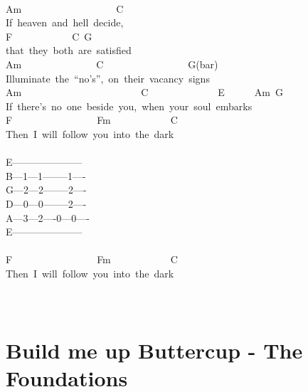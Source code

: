 \documentclass[]{book}
\let\stdsection\section
\renewcommand\section{\clearpage\stdsection}
\begin{document}
~\\
Am~~~~~~~~~~~~~~~~~~~C~~~~~\\
If~heaven~and~hell~decide,~\\
\hspace*{0.333em}\hspace*{0.333em}\hspace*{0.333em}\hspace*{0.333em}\hspace*{0.333em}\hspace*{0.333em}\hspace*{0.333em}\hspace*{0.333em}\hspace*{0.333em}\hspace*{0.333em}\hspace*{0.333em}F~~~~~~~~~~~~C~G\\
that~they~both~are~satisfied\\
Am~~~~~~~~~~~~~~~C~~~~~~~~~~~~~~~~~G(bar)\\
Illuminate~the~``no's'',~on~their~vacancy~signs\\
Am~~~~~~~~~~~~~~~~~~~~~~~~C~~~~~~~~~~~~~~E~~~~~~Am~G\\
If~there's~no~one~beside~you,~when~your~soul~embarks\\
F~~~~~~~~~~~~~~~~~Fm~~~~~~~~~~~~C~~~~\\
Then~I~will~follow~you~into~the~dark\\
~\\
E---------------------\textbar{}\\
B---1---1--------1----\textbar{}\\
G---2---2--------2----\textbar{}\\
D---0---0--------2----\textbar{}\\
A---3---2----0---0----\textbar{}\\
E---------------------\textbar{}\\
~\\
F~~~~~~~~~~~~~~~~~Fm~~~~~~~~~~~~C~~~~\\
Then~I~will~follow~you~into~the~dark\\
~\\
~\\

\hypertarget{build-me-up-buttercup---the-foundations}{%
\section{Build me up Buttercup - The Foundations}\label{build-me-up-buttercup---the-foundations}}
\end{document}
